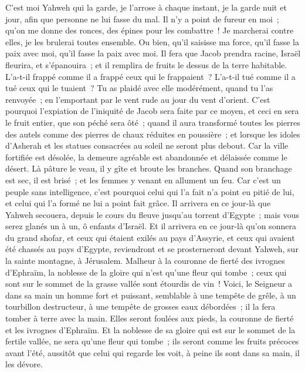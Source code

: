 \begin{multicols}{2}
C'est moi Yahweh qui la garde, je l'arrose à chaque instant, je la garde nuit et jour, afin que personne ne lui fasse du mal.
Il n'y a point de fureur en moi~; qu'on me donne des ronces, des épines pour les combattre~! Je marcherai contre elles, je les brulerai toutes ensemble.
Ou bien, qu'il saisisse ma force, qu'il fasse la paix avec moi, qu'il fasse la paix avec moi.
Il fera que Jacob prendra racine, Israël fleurira, et s'épanouira~; et il remplira de fruits le dessus de la terre habitable.
L'a-t-il frappé comme il a frappé ceux qui le frappaient~? L'a-t-il tué comme il a tué ceux qui le tuaient~?
Tu as plaidé avec elle modérément, quand tu l'as renvoyée~; en l'emportant par le vent rude au jour du vent d'orient.
C'est pourquoi l'expiation de l'iniquité de Jacob sera faite par ce moyen, et ceci en sera le fruit entier, que son péché sera ôté~; quand il aura transformé toutes les pierres des autels comme des pierres de chaux réduites en poussière~; et lorsque les idoles d'Asherah et les statues consacrées au soleil ne seront plus debout.
Car la ville fortifiée est désolée, la demeure agréable est abandonnée et délaissée comme le désert. Là pâture le veau, il y gîte et broute les branches.
Quand son branchage est sec, il est brisé~; et les femmes y venant en allument un feu. Car c'est un peuple sans intelligence, c'est pourquoi celui qui l'a fait n'a point eu pitié de lui, et celui qui l'a formé ne lui a point fait grâce.
Il arrivera en ce jour-là que Yahweh secouera, depuis le cours du fleuve jusqu'au torrent d'Egypte~; mais vous serez glanés un à un, ô enfants d'Israël.
Et il arrivera en ce jour-là qu'on sonnera du grand shofar, et ceux qui étaient exilés au pays d'Assyrie, et ceux qui avaient été chassés au pays d'Egypte, reviendront et se prosterneront devant Yahweh, sur la sainte montagne, à Jérusalem.
\VerseOne{}Malheur à la couronne de fierté des ivrognes d'Ephraïm, la noblesse de la gloire qui n'est qu'une fleur qui tombe~; ceux qui sont sur le sommet de la grasse vallée sont étourdis de vin~!
Voici, le Seigneur a dans sa main un homme fort et puissant, semblable à une tempête de grêle, à un tourbillon destructeur, à une tempête de grosses eaux débordées~; il la fera tomber à terre avec la main.
Elles seront foulées aux pieds, la couronne de fierté et les ivrognes d'Ephraïm.
Et la noblesse de sa gloire qui est sur le sommet de la fertile vallée, ne sera qu'une fleur qui tombe~; ils seront comme les fruits précoces avant l'été, aussitôt que celui qui regarde les voit, à peine ils sont dans sa main, il les dévore.

\end{multicols}
